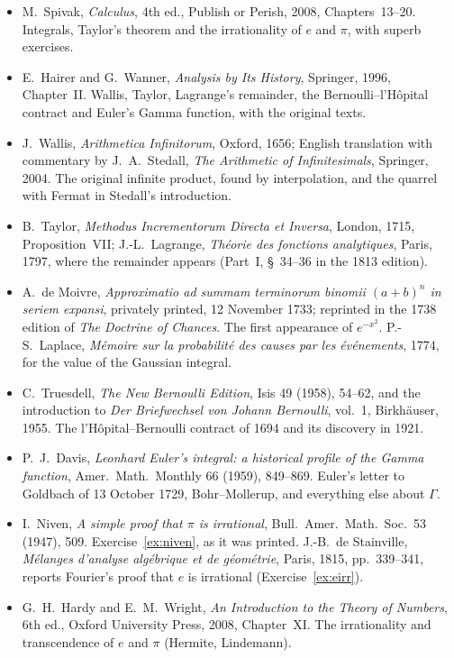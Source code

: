 \begin{itemize}\raggedright
\item M.~Spivak, \emph{Calculus}, 4th ed., Publish or Perish, 2008, Chapters~13--20. Integrals, Taylor's theorem and the irrationality of $e$ and $\pi$, with superb exercises.
\item E.~Hairer and G.~Wanner, \emph{Analysis by Its History}, Springer, 1996, Chapter~II. Wallis, Taylor, Lagrange's remainder, the Bernoulli--l'H\^opital contract and Euler's Gamma function, with the original texts.
\item J.~Wallis, \emph{Arithmetica Infinitorum}, Oxford, 1656; English translation with commentary by J.~A.~Stedall, \emph{The Arithmetic of Infinitesimals}, Springer, 2004. The original infinite product, found by interpolation, and the quarrel with Fermat in Stedall's introduction.
\item B.~Taylor, \emph{Methodus Incrementorum Directa et Inversa}, London, 1715, Proposition~VII; J.-L.~Lagrange, \emph{Th\'eorie des fonctions analytiques}, Paris, 1797, where the remainder appears (Part~I, \S~34--36 in the 1813 edition).
\item A.~de Moivre, \emph{Approximatio ad summam terminorum binomii $(a+b)^n$ in seriem expansi}, privately printed, 12 November 1733; reprinted in the 1738 edition of \emph{The Doctrine of Chances}. The first appearance of $e^{-x^2}$. P.-S.~Laplace, \emph{M\'emoire sur la probabilit\'e des causes par les \'ev\'enements}, 1774, for the value of the Gaussian integral.
\item C.~Truesdell, \emph{The New Bernoulli Edition}, Isis 49 (1958), 54--62, and the introduction to \emph{Der Briefwechsel von Johann Bernoulli}, vol.~1, Birkh\"auser, 1955. The l'H\^opital--Bernoulli contract of 1694 and its discovery in 1921.
\item P.~J.~Davis, \emph{Leonhard Euler's integral: a historical profile of the Gamma function}, Amer.\ Math.\ Monthly 66 (1959), 849--869. Euler's letter to Goldbach of 13 October 1729, Bohr--Mollerup, and everything else about $\Gamma$.
\item I.~Niven, \emph{A simple proof that $\pi$ is irrational}, Bull.\ Amer.\ Math.\ Soc.\ 53 (1947), 509. Exercise~\ref{ex:niven}, as it was printed. J.-B.~de Stainville, \emph{M\'elanges d'analyse alg\'ebrique et de g\'eom\'etrie}, Paris, 1815, pp.~339--341, reports Fourier's proof that $e$ is irrational (Exercise~\ref{ex:eirr}).
\item G.~H.~Hardy and E.~M.~Wright, \emph{An Introduction to the Theory of Numbers}, 6th ed., Oxford University Press, 2008, Chapter~XI. The irrationality and transcendence of $e$ and $\pi$ (Hermite, Lindemann).

\end{itemize}
